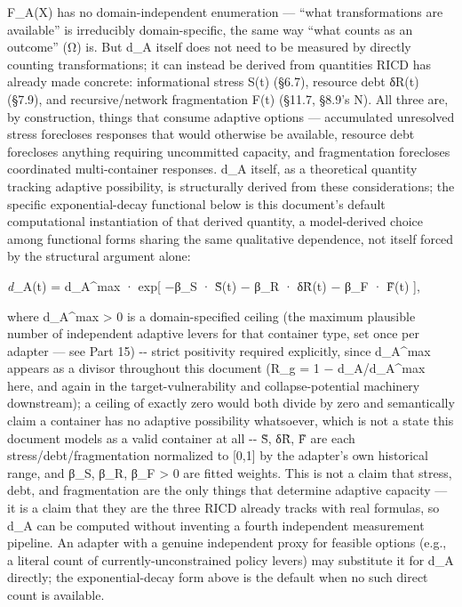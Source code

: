 \documentclass[
]{article}
\begin{document}
F\_A(X) has no domain-independent enumeration --- ``what transformations
are available'' is irreducibly domain-specific, the same way ``what
counts as an outcome'' (Ω) is. But d\_A itself does not need to be
measured by directly counting transformations; it can instead be derived
from quantities RICD has already made concrete: informational stress
S(t) (§6.7), resource debt δR(t) (§7.9), and recursive/network
fragmentation F(t) (§11.7, §8.9's N). All three are, by construction,
things that consume adaptive options --- accumulated unresolved stress
forecloses responses that would otherwise be available, resource debt
forecloses anything requiring uncommitted capacity, and fragmentation
forecloses coordinated multi-container responses. d\_A itself, as a
theoretical quantity tracking adaptive possibility, is structurally
derived from these considerations; the specific exponential-decay
functional below is this document's default computational instantiation
of that derived quantity, a model-derived choice among functional forms
sharing the same qualitative dependence, not itself forced by the
structural argument alone:

\emph{d}\_A(t) = d\_A\^{}max · exp{[} −β\_S · S̃(t) − β\_R · δR̃(t) − β\_F
· F̃(t) {]},

where d\_A\^{}max \textgreater{} 0 is a domain-specified ceiling (the
maximum plausible number of independent adaptive levers for that
container type, set once per adapter --- see Part 15) -\/- strict
positivity required explicitly, since d\_A\^{}max appears as a divisor
throughout this document (R\_g = 1 − d\_A/d\_A\^{}max here, and again in
the target-vulnerability and collapse-potential machinery downstream); a
ceiling of exactly zero would both divide by zero and semantically claim
a container has no adaptive possibility whatsoever, which is not a state
this document models as a valid container at all -\/- S̃, δR̃, F̃ are each
stress/debt/fragmentation normalized to {[}0,1{]} by the adapter's own
historical range, and β\_S, β\_R, β\_F \textgreater{} 0 are fitted
weights. This is not a claim that stress, debt, and fragmentation are
the only things that determine adaptive capacity --- it is a claim that
they are the three RICD already tracks with real formulas, so d\_A can
be computed without inventing a fourth independent measurement pipeline.
An adapter with a genuine independent proxy for feasible options (e.g.,
a literal count of currently-unconstrained policy levers) may substitute
it for d\_A directly; the exponential-decay form above is the default
when no such direct count is available.
\end{document}

